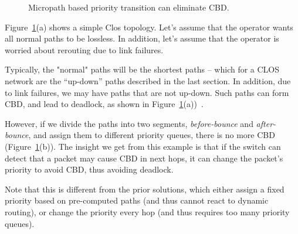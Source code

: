 \begin{figure}[t]
	\centering
	
	
	
	\caption{Micropath based priority transition can eliminate CBD.}\label{fig:priority_transition}
\end{figure}

Figure~\ref{fig:priority_transition}(a) shows a simple Clos topology. Let's
assume that the operator wants all normal paths to be lossless. In addition,
let's assume that the operator is worried about rerouting due to link failures. 

Typically, the "normal" paths will be the shortest paths -- which for a CLOS
network are the ``up-down'' paths described in the last section.  In addition,
due to link failures, we may have paths that are not up-down.  Such paths can
form CBD, and lead to deadlock, as shown in
Figure~\ref{fig:priority_transition}(a))~\cite{shpiner2016unlocking}. 

However, if we divide the paths into two segments, {\em before-bounce} and {\em
after-bounce}, and assign them to different priority queues, there is no more
CBD (Figure~\ref{fig:priority_transition}(b)).  The insight we get from this
example is that if the switch can detect that a packet may cause CBD in next
hops, it can change the packet's priority to avoid CBD, thus avoiding deadlock. 

Note that this is different from the prior solutions, which either assign a
fixed priority based on pre-computed paths (and thus cannot react to dynamic
routing), or change the priority every hop (and thus requires too many priority
queues). 


